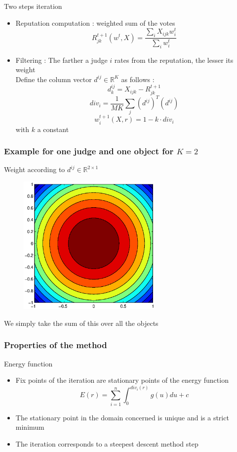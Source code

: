 \begin{frame}
\begin{block}{Two steps iteration}
\begin{itemize}
\item Reputation computation : weighted sum of the votes
$$R_{jk}^{t+1}(w^t,X) = \frac{\sum_{i}X_{ijk}w^t_{i}}{\sum_i w^t_{i}}$$
\item Filtering : The farther a judge $i$ rates from the reputation, the lesser its weight\\
Define the column vector $d^{ij} \in \mathbb{R}^K$ as follows :
$$ d^{ij}_k = X_{ijk}-R^{t+1}_{jk}$$
$$div_i =  \frac{1}{MK}\sum_{j} (d^{ij})^T (d^{ij})$$
$$w_i^{t+1}(X,r) = 1 -k \cdot div_i$$
with $k$ a constant 
\end{itemize}
\end{block}
\end{frame}
\begin{frame}
\frametitle{Example for one judge and one object for $K=2$}
\begin{block}{}
Weight according to $d^{ij}\in \mathbb{R}^{2\times 1}$
\begin{figure}
\centering
\includegraphics[width = 7cm]{../rapport/images/courbes.eps}
\end{figure}
We simply take the sum of this over all the objects
\end{block}
\end{frame}

\begin{frame}
\frametitle{Properties of the method}
\begin{block}{Energy function}
\begin{itemize}
\item Fix points of the iteration are stationary points of the energy function
$$E(r) =  \sum_{i=1}^n \int_0^{div_i(r)}g(u) du + c $$
\item The stationary point in the domain concerned is unique and is a strict minimum
\item The iteration corresponds to a steepest descent method step
\end{itemize}
\end{block}
\end{frame}